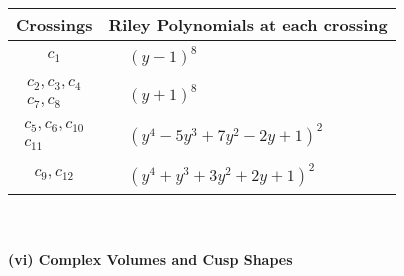 \documentclass[1p]{elsarticle_modified}
\theoremstyle{definition}
\begin{document}
\begin{tabular}{m{50pt}|m{274pt}}
Crossings & \hspace{64pt}Riley Polynomials at each crossing \\
\hline $$\begin{aligned}c_{1}\end{aligned}$$&$\begin{aligned}
&(y-1)^8
\end{aligned}$\\
\hline $$\begin{aligned}c_{2},c_{3},c_{4}\\c_{7},c_{8}\end{aligned}$$&$\begin{aligned}
&(y+1)^8
\end{aligned}$\\
\hline $$\begin{aligned}c_{5},c_{6},c_{10}\\c_{11}\end{aligned}$$&$\begin{aligned}
&(y^4-5 y^3+7 y^2-2 y+1)^2
\end{aligned}$\\
\hline $$\begin{aligned}c_{9},c_{12}\end{aligned}$$&$\begin{aligned}
&(y^4+y^3+3 y^2+2 y+1)^2
\end{aligned}$\\
\hline
\end{tabular}\\~\\
\newpage\flushleft \textbf{(vi) Complex Volumes and Cusp Shapes}
\end{document}
